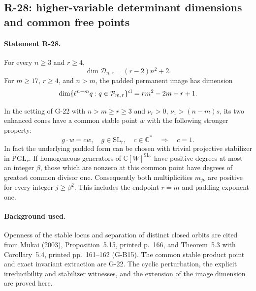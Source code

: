 \subsection{R-28: higher-variable determinant dimensions and common free points}

\paragraph{Statement R-28.}
For every $n\geq3$ and $r\geq4$,
\begin{equation}\label{R28:det_dimension}
 \dim\mathcal D_{n,r}=(r-2)n^2+2.
\end{equation}
For $m\geq17$, $r\geq4$, and $n>m$, the padded permanent
image has dimension
\begin{equation}\label{R28:pad_dimension}
 \dim\{\ell^{n-m}q:q\in\mathcal P_{m,r}\}^{\rm cl}
       =rm^2-2m+r+1.
\end{equation}

In the setting of G-22 with $n>m\geq r\geq3$ and
$\nu_r>0$, $\nu_1>(n-m)s$, its two enhanced cones have a
common stable point $w$ with the following stronger property:
\begin{equation}\label{R28:no_scaling}
 g\cdot w=cw,\quad g\in\mathrm{SL}_r,\quad c\in\mathbb C^*
       \quad\Longrightarrow\quad c=1.
\end{equation}
In fact the underlying padded form can be chosen with trivial
projective stabilizer in $\mathrm{PGL}_r$.
If homogeneous generators of $\mathbb C[W]^{\mathrm{SL}_r}$
have positive degrees at most an integer $\beta$, those which
are nonzero at this common point have degrees of greatest common
divisor one. Consequently both multiplicities $m_{j\nu}$ are
positive for every integer $j\geq\beta^2$.
This includes the endpoint $r=m$ and padding exponent one.

\paragraph{Background used.}
Openness of the stable locus and separation of distinct closed
orbits are cited from Mukai (2003), Proposition~5.15, printed
p.~166, and Theorem~5.3 with Corollary~5.4, printed pp.~161--162
(G-B15). The common stable product point and exact invariant
extraction are G-22. The cyclic perturbation, the explicit
irreducibility and stabilizer witnesses, and the extension of
the image dimension are proved here.

